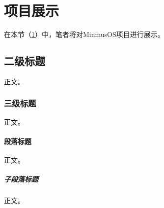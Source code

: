 \section{项目展示}\label{sec:ProjectPresentation}

在本节（\cref{sec:ProjectPresentation}）中，笔者将对MinmusOS项目进行展示。

\subsection{二级标题}

正文。

\subsubsection{三级标题}

正文。

\paragraph{段落标题}

正文。

\subparagraph{子段落标题}

正文。